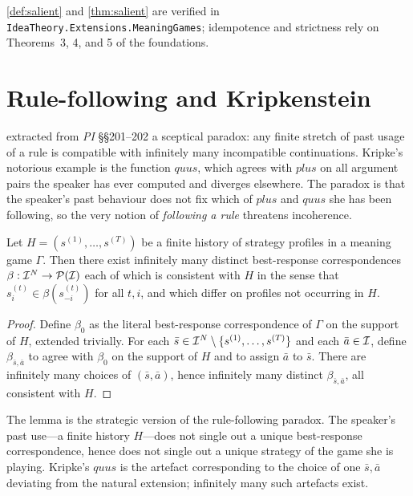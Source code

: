 \formalstatus \cref{def:salient} and \cref{thm:salient} are verified
in \texttt{IdeaTheory.Extensions.MeaningGames}; idempotence and
strictness rely on Theorems~3, 4, and 5 of the foundations.

\section{Rule-following and Kripkenstein}\label{sec:rule-following}

\cite{Kripke1982} extracted from \emph{PI} \S\S201--202 a sceptical
paradox: any finite stretch of past usage of a rule is compatible with
infinitely many incompatible continuations. Kripke's notorious
example is the function $\textit{quus}$, which agrees with $\textit{plus}$
on all argument pairs the speaker has ever computed and diverges
elsewhere. The paradox is that the speaker's past behaviour does not
fix which of $\textit{plus}$ and $\textit{quus}$ she has been
following, so the very notion of \emph{following a rule} threatens
incoherence.

\begin{lemma}\label{lem:underdet}
Let $H=(s^{(1)},\ldots,s^{(T)})$ be a finite history of strategy
profiles in a meaning game $\Gamma$. Then there exist infinitely many
distinct best-response correspondences
$\beta:\mathcal{I}^N\to\mathcal{P}(\mathcal{I})$ each of which is consistent
with $H$ in the sense that $s^{(t)}_i\in\beta(s^{(t)}_{-i})$ for all
$t,i$, and which differ on profiles not occurring in $H$.
\end{lemma}

\begin{proof}
Define $\beta_0$ as the literal best-response correspondence of
$\Gamma$ on the support of $H$, extended trivially. For each
$\bar s\in\mathcal{I}^N\setminus\{s^{(1)},\ldots,s^{(T)}\}$ and each
$\bar a\in\mathcal{I}$, define $\beta_{\bar s,\bar a}$ to agree with
$\beta_0$ on the support of $H$ and to assign $\bar a$ to $\bar s$.
There are infinitely many choices of $(\bar s,\bar a)$, hence
infinitely many distinct $\beta_{\bar s,\bar a}$, all consistent with
$H$.
\end{proof}

The lemma is the strategic version of the rule-following paradox. The
speaker's past use---a finite history $H$---does not single out a
unique best-response correspondence, hence does not single out a
unique strategy of the game she is playing. Kripke's $\textit{quus}$ is
the artefact corresponding to the choice of one $\bar s,\bar a$
deviating from the natural extension; infinitely many such artefacts
exist.

